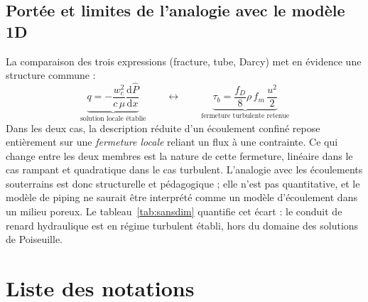 \documentclass[11pt,a4paper]{report}
\newcommand{\Chat}{\hat{P}}
\begin{document}
\subsection{Portée et limites de l'analogie avec le modèle 1D}

La comparaison des trois expressions (fracture, tube, Darcy) met en évidence une structure commune :
\begin{equation}
\underbrace{q = -\frac{w_c^2}{c\,\mu}\frac{\mathrm{d}\Chat}{\mathrm{d}x}}_{\text{solution locale établie}}
\qquad\longleftrightarrow\qquad
\underbrace{\tau_b = \frac{f_D}{8}\rho\,f_m\,\frac{u^2}{2}}_{\text{fermeture turbulente retenue}}
\label{eq:analogie}
\end{equation}
Dans les deux cas, la description réduite d'un écoulement confiné repose entièrement sur une
\emph{fermeture locale} reliant un flux à une contrainte. Ce qui change entre les deux membres est la
nature de cette fermeture, linéaire dans le cas rampant et quadratique dans le cas turbulent. L'analogie
avec les écoulements souterrains est donc structurelle et pédagogique ; elle n'est pas quantitative, et le
modèle de piping ne saurait être interprété comme un modèle d'écoulement dans un milieu poreux.
Le tableau~\ref{tab:sansdim} quantifie cet écart : le conduit de renard hydraulique est en régime
turbulent établi, hors du domaine des solutions de Poiseuille.

\section*{Liste des notations}
\end{document}
